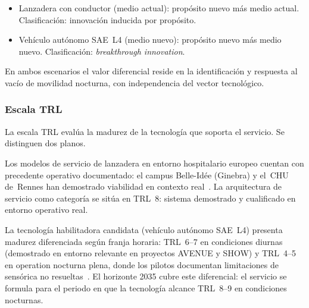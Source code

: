 \begin{itemize}
  \item Lanzadera con conductor (medio actual): propósito nuevo
    más medio actual. Clasificación: innovación inducida
    por propósito.
  \item Vehículo autónomo SAE~L4 (medio nuevo): propósito nuevo
    más medio nuevo. Clasificación: \emph{breakthrough innovation}.
\end{itemize}

En ambos escenarios el valor diferencial reside en la
identificación y respuesta al vacío de movilidad nocturna, con
independencia del vector tecnológico.

\subsubsection{Escala TRL}

La escala TRL evalúa la madurez de la tecnología que soporta el
servicio. Se distinguen dos planos.

Los modelos de servicio de lanzadera en entorno hospitalario
europeo cuentan con precedente operativo documentado: el campus
Belle-Idée (Ginebra) y el~\acs{CHU} de~Rennes han demostrado
viabilidad en contexto real~\parencite{AVENUE2023,SHOW2024Legacy}.
La arquitectura de servicio como categoría se sitúa en TRL~8:
sistema demostrado y cualificado en entorno operativo real.

La tecnología habilitadora candidata (vehículo autónomo SAE~L4)
presenta madurez diferenciada según franja horaria: TRL~6--7
en condiciones diurnas (demostrado en entorno relevante en
proyectos AVENUE y SHOW) y TRL~4--5 en operation nocturna
plena, donde los pilotos documentan limitaciones de sensórica
no resueltas~\parencite{SHOW2024Legacy}. El horizonte 2035
cubre este diferencial: el servicio se formula para el periodo
en que la tecnología alcance TRL~8--9 en condiciones nocturnas.

